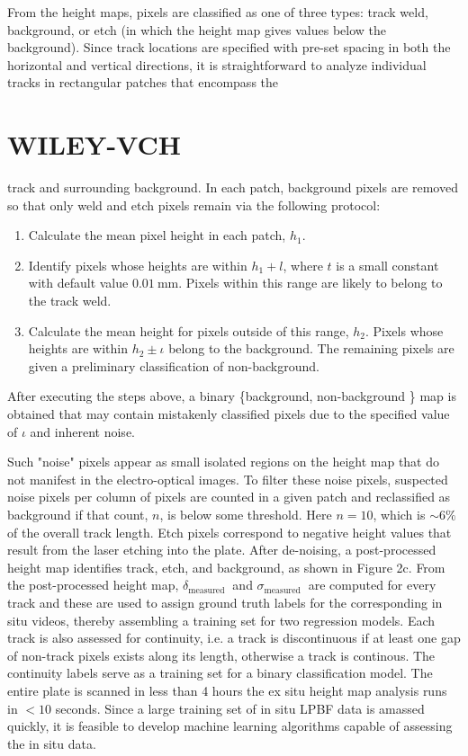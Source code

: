 \documentclass[10pt]{article}
\begin{document}
From the height maps, pixels are classified as one of three types: track weld, background, or etch (in which the height map gives values below the background). Since track locations are specified with pre-set spacing in both the horizontal and vertical directions, it is straightforward to analyze individual tracks in rectangular patches that encompass the

\section*{WILEY-VCH}
track and surrounding background. In each patch, background pixels are removed so that only weld and etch pixels remain via the following protocol:

\begin{enumerate}
  \item Calculate the mean pixel height in each patch, $h_{1}$.

  \item Identify pixels whose heights are within $h_{1}+l$, where $t$ is a small constant with default value $0.01 \mathrm{~mm}$. Pixels within this range are likely to belong to the track weld.

  \item Calculate the mean height for pixels outside of this range, $h_{2}$. Pixels whose heights are within $h_{2} \pm \iota$ belong to the background. The remaining pixels are given a preliminary classification of non-background.

\end{enumerate}

After executing the steps above, a binary \{background, non-background \} map is obtained that may contain mistakenly classified pixels due to the specified value of $\iota$ and inherent noise.

Such "noise" pixels appear as small isolated regions on the height map that do not manifest in the electro-optical images. To filter these noise pixels, suspected noise pixels per column of pixels are counted in a given patch and reclassified as background if that count, $n$, is below some threshold. Here $n=10$, which is $\sim 6 \%$ of the overall track length. Etch pixels correspond to negative height values that result from the laser etching into the plate. After de-noising, a post-processed height map identifies track, etch, and background, as shown in Figure 2c. From the post-processed height map, $\delta_{\text {measured }}$ and $\sigma_{\text {measured }}$ are computed for every track and these are used to assign ground truth labels for the corresponding in situ videos, thereby assembling a training set for two regression models. Each track is also assessed for continuity, i.e. a track is discontinuous if at least one gap of non-track pixels exists along its length, otherwise a track is continous. The continuity labels serve as a training set for a binary classification model. The entire plate is scanned in less than 4 hours the ex situ height map analysis runs in $<10$ seconds. Since a large training set of in situ LPBF data is amassed quickly, it is feasible to develop machine learning algorithms capable of assessing the in situ data.
\end{document}

